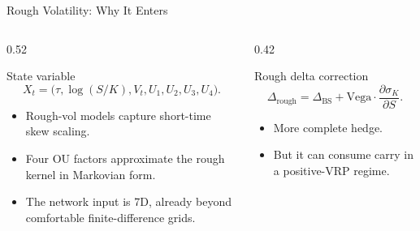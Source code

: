 \documentclass[11pt,aspectratio=169]{beamer}
\newcommand{\1}{\mathbf{1}}
\begin{document}
\begin{frame}{Rough Volatility: Why It Enters}
    \small
    \begin{columns}[T,onlytextwidth]
    \begin{column}{0.52\textwidth}
    \begin{block}{State variable}
    \[
    X_t =
    \bigl(\tau,\log(S/K),V_t,U_1,U_2,U_3,U_4\bigr).
    \]
    \end{block}
    \begin{itemize}
        \item Rough-vol models capture short-time skew scaling.
        \item Four OU factors approximate the rough kernel in Markovian form.
        \item The network input is 7D, already beyond comfortable finite-difference grids.
    \end{itemize}
    \end{column}
    \begin{column}{0.42\textwidth}
    \begin{block}{Rough delta correction}
    \[
        \Delta_{\mathrm{rough}}
        =
        \Delta_{\mathrm{BS}}
        +
        \mathrm{Vega}
        \cdot
        \frac{\partial \sigma_K}{\partial S}.
    \]
    \end{block}
    \begin{itemize}
        \item More complete hedge.
        \item But it can consume carry in a positive-VRP regime.
    \end{itemize}
    \end{column}
    \end{columns}
\end{frame}
\end{document}
